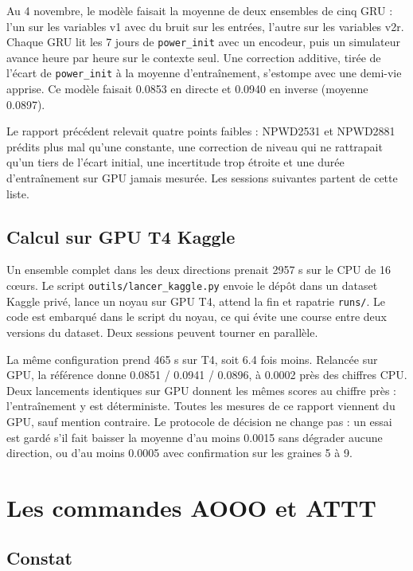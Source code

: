 \documentclass[11pt,a4paper]{article}
\newcommand{\code}[1]{\texttt{#1}}
\begin{document}
Au 4 novembre, le modèle faisait la moyenne de deux ensembles de cinq GRU : l'un sur les variables v1 avec du bruit sur les entrées, l'autre sur les variables v2r. Chaque GRU lit les 7 jours de \code{power\_init} avec un encodeur, puis un simulateur avance heure par heure sur le contexte seul. Une correction additive, tirée de l'écart de \code{power\_init} à la moyenne d'entraînement, s'estompe avec une demi-vie apprise. Ce modèle faisait 0.0853 en directe et 0.0940 en inverse (moyenne 0.0897).

Le rapport précédent relevait quatre points faibles : NPWD2531 et NPWD2881 prédits plus mal qu'une constante, une correction de niveau qui ne rattrapait qu'un tiers de l'écart initial, une incertitude trop étroite et une durée d'entraînement sur GPU jamais mesurée. Les sessions suivantes partent de cette liste.

\subsection{Calcul sur GPU T4 Kaggle}

Un ensemble complet dans les deux directions prenait 2957 s sur le CPU de 16 cœurs. Le script \code{outils/lancer\_kaggle.py} envoie le dépôt dans un dataset Kaggle privé, lance un noyau sur GPU T4, attend la fin et rapatrie \code{runs/}. Le code est embarqué dans le script du noyau, ce qui évite une course entre deux versions du dataset. Deux sessions peuvent tourner en parallèle.

La même configuration prend 465 s sur T4, soit 6.4 fois moins. Relancée sur GPU, la référence donne 0.0851 / 0.0941 / 0.0896, à 0.0002 près des chiffres CPU. Deux lancements identiques sur GPU donnent les mêmes scores au chiffre près : l'entraînement y est déterministe. Toutes les mesures de ce rapport viennent du GPU, sauf mention contraire. Le protocole de décision ne change pas : un essai est gardé s'il fait baisser la moyenne d'au moins 0.0015 sans dégrader aucune direction, ou d'au moins 0.0005 avec confirmation sur les graines 5 à 9.

\section{Les commandes AOOO et ATTT}

\subsection{Constat}
\end{document}
